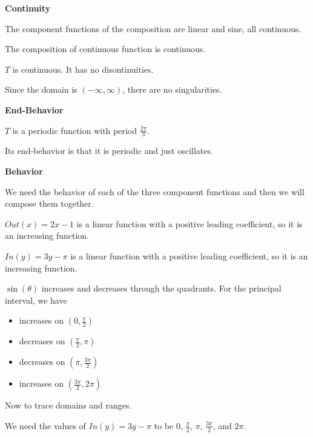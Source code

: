 \documentclass{ximera}
\begin{document}
\textbf{\textcolor{blue!55!black}{Continuity}}


The component functions of the composition are linear and sine, all continuous. 

The composition of continuous function is continuous.

$T$ is continuous. It has no disontinuities. 


Since the domain is $(-\infty, \infty)$, there are no singularities. 








\textbf{\textcolor{blue!55!black}{End-Behavior}}


$T$ is a periodic function with period $\frac{2\pi}{3}$. 

Its end-behavior is that it is periodic and just oscillates.












\textbf{\textcolor{blue!55!black}{Behavior}}


We need the behavior of each of the three component functions and then we will compose them together. 




$Out(x) = 2x - 1$ is a linear function with a positive leading coefficient, so it is an increasing function.


$In(y) = 3y - \pi$ is a linear function with a positive leading coefficient, so it is an increasing function.


$\sin(\theta)$ increases and decreases through the quadrants. For the principal interval, we have


\begin{itemize}
  \item increases on $\left( 0, \frac{\pi}{2} \right)$
  \item decreases on $\left( \frac{\pi}{2}, \pi \right)$
  \item decreases on $\left( \pi, \frac{3\pi}{2} \right)$
  \item increases on $\left( \frac{3\pi}{2}, 2\pi \right)$
\end{itemize}


Now to trace domains and ranges.


We need the values of $In(y) = 3y - \pi$ to be $0$, $\frac{\pi}{2}$, $\pi$, $\frac{3\pi}{2}$, and $2\pi$. 
\end{document}
